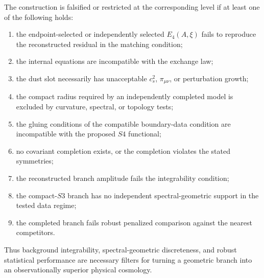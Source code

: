 \documentclass[11pt,a4paper]{article}
\def\Sthree{S3}%
\def\Sfour{S4}%
\numberwithin{equation}{section}
\theoremstyle{remark}
\newcommand{\Sthree}{S^3}
\newcommand{\Sfour}{S^4}
\newcommand{\Efour}{E_4}
\begin{document}
The construction is falsified or restricted at the corresponding level if at least one of the following holds:
\begin{enumerate}
\item the endpoint-selected or independently selected \(\Efour(A,\xi)\) fails to reproduce the reconstructed residual in the matching condition;
\item the internal equations are incompatible with the exchange law;
\item the dust slot necessarily has unacceptable \(c_s^2\), \(\pi_{\mu\nu}\), or perturbation growth;
\item the compact radius required by an independently completed model is excluded by curvature, spectral, or topology tests;
\item the gluing conditions of the compatible boundary-data condition are incompatible with the proposed \(\Sfour\) functional;
\item no covariant completion exists, or the completion violates the stated symmetries;
\item the reconstructed branch amplitude fails the integrability condition;
\item the compact-\(\Sthree\) branch has no independent spectral-geometric support in the tested data regime;
\item the completed branch fails robust penalized comparison against the nearest competitors.
\end{enumerate}

Thus background integrability, spectral-geometric discreteness, and robust statistical performance are necessary filters for turning a geometric branch into an observationally superior physical cosmology.
\end{document}
